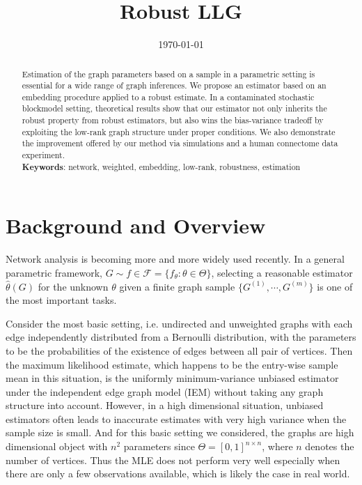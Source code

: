\documentclass[a4paper]{article}
\title{Robust LLG}
\date{\today}
\renewcommand{\hat}{\widehat}
\begin{document}
\maketitle

\begin{abstract}

Estimation of the graph parameters based on a sample in a parametric setting is essential for a wide range of graph inferences. We propose an estimator based on an embedding procedure applied to a robust estimate. In a contaminated stochastic blockmodel setting, theoretical results show that our estimator not only inherits the robust property from robust estimators, but also wins the bias-variance tradeoff by exploiting the low-rank graph structure under proper conditions. We also demonstrate the improvement offered by our method via simulations and a human connectome data experiment. \\
{\bf Keywords}: network, weighted, embedding, low-rank, robustness, estimation
\end{abstract}

\section{Background and Overview}

Network analysis is becoming more and more widely used recently. In a general parametric framework, $G \sim f \in \mathcal{F} = \{f_{\theta} : \theta \in \Theta \}$, selecting a reasonable estimator $\hat{\theta}(G)$ for the unknown $\theta$ given a finite graph sample $\{G^{(1)}, \cdots, G^{(m)}\}$ is one of the most important tasks.

Consider the most basic setting, i.e. undirected and unweighted graphs with each edge independently distributed from a Bernoulli distribution, with the parameters to be the probabilities of the existence of edges between all pair of vertices.
Then the maximum likelihood estimate, which happens to be the entry-wise sample mean in this situation, is the uniformly minimum-variance unbiased estimator under the independent edge graph model (IEM) \citep{bollobas2007phase} without taking any graph structure into account. 
However, in a high dimensional situation, unbiased estimators often leads to inaccurate estimates with very high variance when the sample size is small. And for this basic setting we considered, the graphs are high dimensional object with $n^2$ parameters since $\Theta = [0, 1]^{n\times n}$, where $n$ denotes the number of vertices. Thus the MLE does not perform very well especially when there are only a few observations available, which is likely the case in real world.
\end{document}
